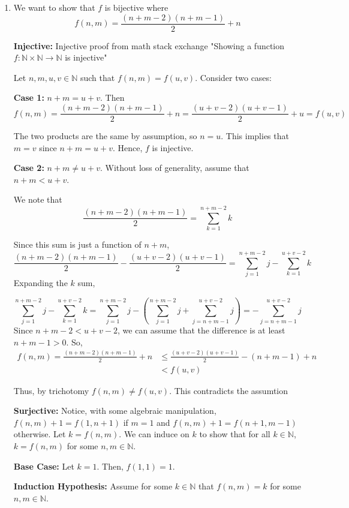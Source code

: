 \documentclass[12pt]{article}
\begin{document}
\begin{enumerate}[start=1,label={\bfseries Problem \arabic*:},leftmargin=1in]
    \item We want to show that $f$ is bijective where 
    \[
        f(n, m) = \frac{(n+m-2)(n+m-1)}{2} +n 
    \]

    \textbf{Injective:} Injective proof from math stack exchange "Showing a function $f : \mathbb{N} \times \mathbb{N} \to \mathbb{N}$
    is injective" 

    Let $n, m, u, v \in \mathbb{N}$ such that $f(n, m) = f(u, v)$. 
    Consider two cases:

    \textbf{Case 1:} $n + m = u + v$.
    Then \[f(n, m) = \frac{(n+m-2)(n+m-1)}{2} +n = \frac{(u+v-2)(u+v-1)}{2} +u = f(u, v)\]
    
    The two products are the same by assumption, so $n = u$. This implies that $m = v$ since $n + m = u + v$. Hence, $f$ is injective. 

    \textbf{Case 2:} $n + m \neq u + v$. Without loss of generality, assume that $n + m < u + v$. 

    We note that 
    \[
    \frac{(n+m-2)(n+m-1)}{2} = \sum^{n+m-2}_{k = 1} k 
    \]

    Since this sum is just a function of $n + m$, 
    \[ 
        \frac{(n+m-2)(n+m-1)}{2} - \frac{(u+v-2)(u+v-1)}{2} = \sum^{n+m-2}_{j = 1} j - \sum^{u+v-2}_{k = 1} k  
    \]
    Expanding the $k$ sum, 

    \[
        \sum^{n+m-2}_{j = 1} j - \sum^{u+v-2}_{k = 1} k  = \sum^{n+m-2}_{j = 1} j - (\sum^{n+m-2}_{j = 1} j + \sum^{u+v-2}_{j = n+m-1} j) = -\sum^{u+v-2}_{j = n+m-1} j
    \]
    Since $n +m-2 < u + v - 2$, we can assume that the difference is at least $n + m - 1 > 0$. 
    So, \begin{align*}
        f(n, m) =  \frac{(n+m-2)(n+m-1)}{2} + n &\leq \frac{(u+v-2)(u+v-1)}{2} - (n + m - 1) + n \\ 
        &< f(u, v)
    \end{align*} 

    Thus, by trichotomy $f(n, m) \neq f(u, v)$. This contradicts the assumtion 

    \textbf{Surjective:} Notice, with some algebraic manipulation, $f(n, m) + 1 = f(1, n+1)$ if $m = 1$ and $f(n, m) + 1 = f(n+1, m-1)$ otherwise. 
    Let $k = f(n, m)$. We can induce on $k$ to show that for all $k \in \mathbb{N}$, $k = f(n, m)$ for some $n, m \in \mathbb{N}$. 

    \textbf{Base Case:} Let $k = 1$. Then, $f(1, 1) = 1$.

    \textbf{Induction Hypothesis:} Assume for some $k \in \mathbb{N}$ that $f(n, m) = k$ for some $n, m \in \mathbb{N}$.


\end{enumerate}
\end{document}

